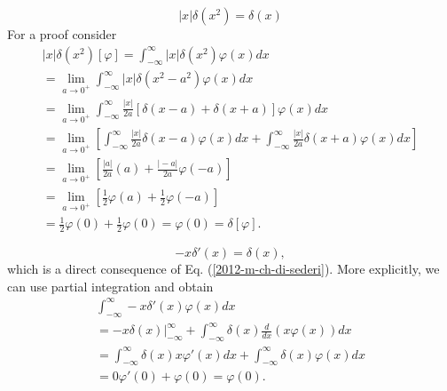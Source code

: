  \begin{equation}
 \vert x\vert \delta (x^2)=\delta (x)
 \end{equation}
{\color{OliveGreen}
\bproof
For a proof consider
 \begin{equation}
 \begin{split}
\vert x \vert \delta (x^2)[\varphi ]
=
\int_{-\infty}^{\infty}\vert x \vert \delta (x^2)\varphi (x) dx\\
=
\lim_{a\rightarrow 0^+}
\int_{-\infty}^{\infty}\vert x \vert \delta (x^2-a^2)\varphi (x) dx    \\
=
\lim_{a\rightarrow 0^+}
\int_{-\infty}^{\infty}\frac{\vert x \vert}{2a} \left[ \delta (x -a ) + \delta (x + a )\right] \varphi (x) dx \\
=
\lim_{a\rightarrow 0^+} \left[
\int_{-\infty}^{\infty}\frac{\vert x \vert}{2a}   \delta (x -a ) \varphi (x) dx  +
\int_{-\infty}^{\infty}\frac{\vert x \vert}{2a}  \delta (x + a )\varphi (x) dx \right]  \\
=
\lim_{a\rightarrow 0^+} \left[
 \frac{\vert a \vert}{2a}     (a)   +
 \frac{\vert -a \vert}{2a}  \varphi (-a)   \right]  \\
=
\lim_{a\rightarrow 0^+} \left[
 \frac{1}{2 }     \varphi (a)    +
 \frac{1}{2 }  \varphi (-a)   \right]  \\
=
\frac{1}{2 }     \varphi (0)   +
 \frac{1}{2 }  \varphi (0)
= \varphi (0)
=
\delta[\varphi ]
.
 \end{split}
 \end{equation}
\eproof
}

 \begin{equation}
 -x\delta '(x)=\delta (x),
 \end{equation}
which is a direct consequence of Eq. (\ref{2012-m-ch-di-sederi}).
{\color{OliveGreen}
\bproof
More explicitly, we can use partial integration and obtain
 \begin{equation}
 \begin{split}
\int _{-\infty}^\infty -x \delta' (x)  \varphi (x)  dx  \\
 =  - \left. x \delta (x)\right|_{-\infty}^\infty  + \int _{-\infty}^\infty \delta (x)
\frac{d}{dx}\left(x \varphi (x)\right)dx\\
 =
\int _{-\infty}^\infty \delta (x)
x \varphi' (x)  dx
+
\int _{-\infty}^\infty \delta (x)
\varphi (x) dx\\
 =
0 \varphi' (0)  +
\varphi (0)= \varphi (0).
 \end{split}
 \end{equation}
\eproof
}


